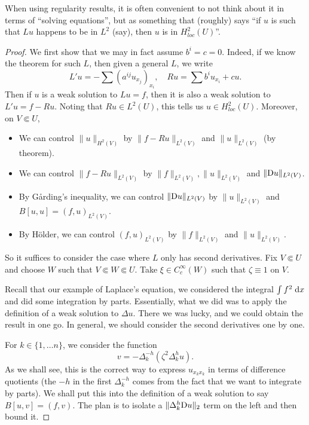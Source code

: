 \documentclass[a4paper]{article}
\begin{document}
When using regularity results, it is often convenient to not think about it in terms of ``solving equations'', but as something that (roughly) says ``if $u$ is such that $Lu$ happens to be in $L^2$ (say), then $u$ is in $H^2_{loc}(U)$''.
\begin{proof}
  We first show that we may in fact assume $b^i = c = 0$. Indeed, if we know the theorem for such $L$, then given a general $L$, we write
  \[
    L'u = -\sum (a^{ij} u_{x_j})_{x_i},\quad Ru = \sum b^i u_{x_i} + cu.
  \]
  Then if $u$ is a weak solution to $Lu = f$, then it is also a weak solution to $L'u = f - Ru$. Noting that $Ru \in L^2(U)$, this tells us $u \in H^2_{loc}(U)$. Moreover, on $V \Subset U$,
  \begin{itemize}
    \item We can control $\|u\|_{H^2(V)}$ by $\|f - Ru\|_{L^2(V)}$ and $\|u\|_{L^2(V)}$ (by theorem).
    \item We can control $\|f - Ru\|_{L^2(V)}$ by $\|f\|_{L^2(V)}, \|u\|_{L^2(V)}$ and $\|\mathrm{D} u\|_{L^2(V)}$.
    \item By G\r{a}rding's inequality, we can control $\|\mathrm{D} u\|_{L^2(V)}$ by $\|u\|_{L^2(V)}$ and $B[u, u] = (f, u)_{L^2(V)}$.
    \item By H\"older, we can control $(f, u)_{L^2(V)}$ by $\|f\|_{L^2(V)}$ and $\|u\|_{L^2(V)}$.
  \end{itemize}

  So it suffices to consider the case where $L$ only has second derivatives. Fix $V \Subset U$ and choose $W$ such that $V \Subset W \Subset U$. Take $\xi \in C_c^\infty(W)$ such that $\zeta \equiv 1$ on $V$.

  Recall that our example of Laplace's equation, we considered the integral $\int f^2\;\mathrm{d} x$ and did some integration by parts. Essentially, what we did was to apply the definition of a weak solution to $\Delta u$. There we was lucky, and we could obtain the result in one go. In general, we should consider the second derivatives one by one.

  For $k \in \{1, \ldots n\}$, we consider the function
  \[
    v = - \Delta_k^{-h} (\zeta^2 \Delta_k^h u).
  \]
  As we shall see, this is the correct way to express $u_{x_k x_k}$ in terms of difference quotients (the $-h$ in the first $\Delta_k^{-h}$ comes from the fact that we want to integrate by parts). We shall put this into the definition of a weak solution to say $B[u, v] = (f, v)$. The plan is to isolate a $\|\Delta^h_k \mathrm{D} u\|_2$ term on the left and then bound it.


\end{proof}
\end{document}
